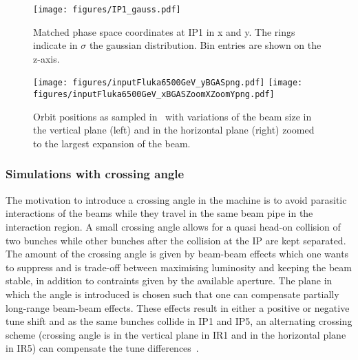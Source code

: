 \begin{figure}%
\begin{center}
\texttt{[image: figures/IP1\_gauss.pdf]}
\end{center}
\vspace{-0.6cm}
 \caption{Matched phase space coordinates at IP1 in x and y. The rings indicate in $\sigma$ the gaussian distribution. Bin entries are shown on the z-axis.
  \label{ip1_gauss}}
\end{figure}


\begin{figure}[!htb]
\begin{center}
  \texttt{[image: figures/inputFluka6500GeV\_yBGASpng.pdf]}
  \texttt{[image: figures/inputFluka6500GeV\_xBGASZoomXZoomYpng.pdf]}
\end{center}
\vspace{-0.6cm}
 \caption{Orbit positions as sampled in \fluka~with variations of the beam size in the vertical plane (left) and in the horizontal plane (right) zoomed to the largest expansion of the beam.
  \label{BGASflukaInp}}
\end{figure}


\subsubsection{Simulations with crossing angle}
The motivation to introduce a crossing angle in the machine is to avoid parasitic interactions of the beams while they travel in the same beam pipe in the interaction region. A small crossing angle allows for a quasi head-on collision of two bunches while other bunches after the collision at the IP are kept separated. The amount of the crossing angle is given by beam-beam effects which one wants to suppress and is trade-off between maximising luminosity and keeping the beam stable, in addition to contraints given by the available aperture. The plane in which the angle is introduced is chosen such that one can compensate partially long-range beam-beam effects. These effects result in either a positive or negative tune shift and as the same bunches collide in IP1 and IP5, an alternating crossing scheme (crossing angle is in the vertical plane in IR1 and in the horizontal plane in IR5) can compensate the tune differences~\cite{wherrSlides2013}.

